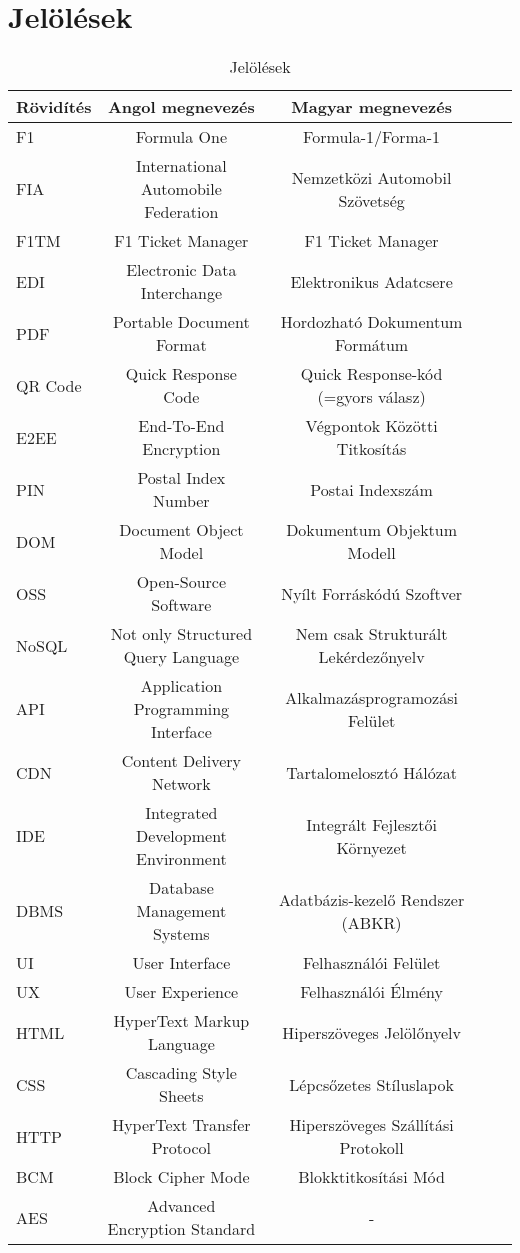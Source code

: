 \chapter{Jelölések}%

\begin{table}[h!]
	\centering
	\begin{tabular}{ | l | c | c | c | c |}
		\hline 
		\textbf{Rövidítés} & \textbf{Angol megnevezés} & \textbf{Magyar megnevezés}\\
		\hline
		F1 & Formula One & Formula-1/Forma-1\\
		\hline
	FIA & International Automobile Federation & Nemzetközi Automobil Szövetség \\
	\hline
	F1TM & F1 Ticket Manager & F1 Ticket Manager \\
	\hline
	EDI & Electronic Data Interchange & Elektronikus Adatcsere \\
	\hline
	PDF & Portable Document Format & Hordozható Dokumentum Formátum \\
	\hline
	QR Code & Quick Response Code & Quick Response-kód (=gyors válasz) \\
	\hline
	E2EE & End-To-End Encryption & Végpontok Közötti Titkosítás \\
	\hline
	PIN & Postal Index Number & Postai Indexszám \\
	\hline
	DOM & Document Object Model & Dokumentum Objektum Modell \\
	\hline
	OSS & Open-Source Software & Nyílt Forráskódú Szoftver \\
	\hline
	NoSQL & Not only Structured Query Language & Nem csak Strukturált
	 Lekérdezőnyelv \\
	\hline
	API & Application Programming Interface & Alkalmazásprogramozási Felület \\
	\hline
	CDN & Content Delivery Network & Tartalomelosztó Hálózat \\
	\hline
	IDE & Integrated Development Environment & Integrált Fejlesztői Környezet \\
	\hline
	DBMS & Database Management Systems & Adatbázis-kezelő Rendszer (ABKR) \\
	\hline
	UI & User Interface & Felhasználói Felület \\
	\hline
	UX & User Experience & Felhasználói Élmény \\
	\hline
	HTML & HyperText Markup Language & Hiperszöveges Jelölőnyelv \\
	\hline
	CSS & Cascading Style Sheets & Lépcsőzetes Stíluslapok \\
	\hline
	HTTP & HyperText Transfer Protocol & Hiperszöveges Szállítási Protokoll \\
	\hline
	BCM & Block Cipher Mode & Blokktitkosítási Mód \\
	\hline
	AES & Advanced Encryption Standard & - \\
	\hline
	\end{tabular}
	\caption{Jelölések}
	\label{tablazat1}
\end{table}